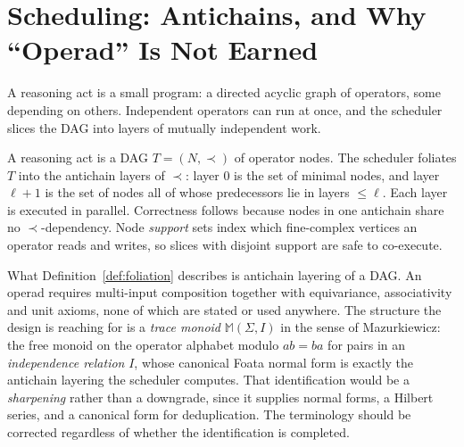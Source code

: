 \chapter{Scheduling: Antichains, and Why ``Operad'' Is Not Earned}\label{ch:operad}

\begin{intu}\Intu
A reasoning act is a small program: a directed acyclic graph of
operators, some depending on others. Independent operators can run at
once, and the scheduler slices the DAG into layers of mutually
independent work.
\end{intu}

\begin{definition}\label{def:foliation}
A reasoning act is a DAG $T=(N,\prec)$ of operator nodes. The scheduler
foliates $T$ into the antichain layers of $\prec$: layer $0$ is the set
of minimal nodes, and layer $\ell+1$ is the set of nodes all of whose
predecessors lie in layers $\le\ell$. Each layer is executed in
parallel. Correctness follows because nodes in one antichain share no
$\prec$-dependency. Node \emph{support} sets index which fine-complex
vertices an operator reads and writes, so slices with disjoint support
are safe to co-execute.
\end{definition}

\begin{remark}\label{rem:tracemonoid}
What Definition~\ref{def:foliation} describes is antichain layering of a
DAG. An operad requires multi-input composition together with
equivariance, associativity and unit axioms, none of which are stated or
used anywhere. The structure the design is reaching for is a
\emph{trace monoid} $\mathbb M(\Sigma,I)$ in the sense of Mazurkiewicz:
the free monoid on the operator alphabet modulo $ab=ba$ for pairs in an
\emph{independence relation} $I$, whose canonical Foata normal form is
exactly the antichain layering the scheduler computes. That
identification would be a \emph{sharpening} rather than a downgrade,
since it supplies normal forms, a Hilbert series, and a canonical form
for deduplication. The terminology should be corrected regardless of
whether the identification is completed.
\end{remark}

